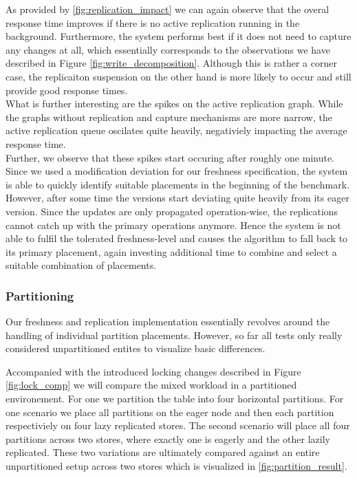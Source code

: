As provided by \ref{fig:replication_impact} we can again observe that the overal response time improves if there is no active replication running in the background.
Furthermore, the system performs best if it does not need to capture any changes at all, 
which essentially corresponds to the observations we have described in Figure \ref{fig:write_decomposition}.
Although this is rather a corner case, the replicaiton suspension on the other hand is more likely to occur and still provide good response times.\\

What is further interesting are the spikes on the active replication graph. While the graphs without replication and capture mechanisms are more narrow,
the active replication queue oscilates quite heavily, negativiely impacting the average response time.\\
Further, we observe that these spikes start occuring after roughly one minute.
Since we used a modification deviation for our freshness specification, the system is able to quickly identify suitable placements in the beginning of the benchmark.
However, after some time the versions start deviating quite heavily from its eager version.
Since the updates are only propagated operation-wise, the replications cannot catch up with the primary operations anymore.
Hence the system is not able to fulfil the tolerated freshness-level and
causes the algorithm to fall back to its primary placement, again investing additional time to combine and select a suitable combination of placements.\\




\subsubsection{Partitioning} 

Our freshness and replication implementation essentially revolves around the handling of individual partition placements.
However, so far all tests only really considered unpartitioned entites to visualize basic differences. 

Accompanied with the introduced locking changes described in Figure \ref{fig:lock_comp} we will compare the mixed workload in 
a partitioned environement. For one we partition the table into four horizontal partitions. 
For one scenario we place all partitions on the eager node and then each partition respectiviely on four lazy replicated stores.
The second scenario will place all four partitions across two stores, where exactly one is eagerly and the other lazily replicated. 
These two variations are ultimately compared against an entire unpartitioned setup across two stores which is visualized in \ref{fig:partition_result}.


